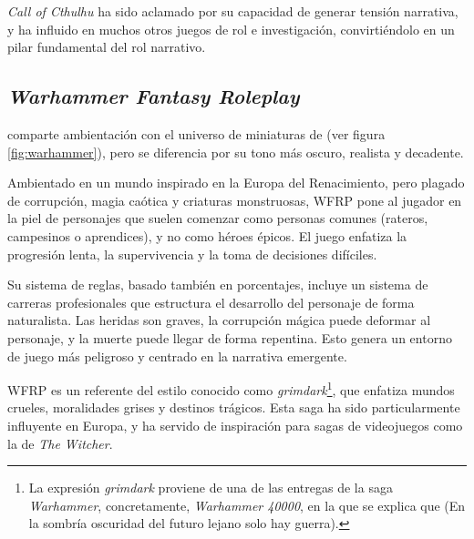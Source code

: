 \medskip

\textit{Call of Cthulhu} ha sido aclamado por su capacidad de generar tensión narrativa, y ha influido en muchos otros juegos de rol e investigación, convirtiéndolo en un pilar fundamental del rol narrativo.

\subsection{\textit{Warhammer Fantasy Roleplay}}

\cite{warhammer} comparte ambientación con el universo de miniaturas de \cite{warhammerbattle} (ver figura \ref{fig:warhammer}), pero se diferencia por su tono más oscuro, realista y decadente.

\medskip

Ambientado en un mundo inspirado en la Europa del Renacimiento, pero plagado de corrupción, magia caótica y criaturas monstruosas, WFRP pone al jugador en la piel de personajes que suelen comenzar como personas comunes (rateros, campesinos o aprendices), y no como héroes épicos. El juego enfatiza la progresión lenta, la supervivencia y la toma de decisiones difíciles.

\medskip

Su sistema de reglas, basado también en porcentajes, incluye un sistema de carreras profesionales que estructura el desarrollo del personaje de forma naturalista. Las heridas son graves, la corrupción mágica puede deformar al personaje, y la muerte puede llegar de forma repentina. Esto genera un entorno de juego más peligroso y centrado en la narrativa emergente.

\medskip

WFRP es un referente del estilo conocido como \textit{grimdark}\footnote{La expresión \textit{grimdark} proviene de una de las entregas de la saga \textit{Warhammer}, concretamente, \textit{Warhammer 40000}, en la que se explica que  (En la sombría oscuridad del futuro lejano solo hay guerra).}, que enfatiza mundos crueles, moralidades grises y destinos trágicos. Esta saga ha sido particularmente influyente en Europa, y ha servido de inspiración para sagas de videojuegos como la de \textit{The Witcher}.